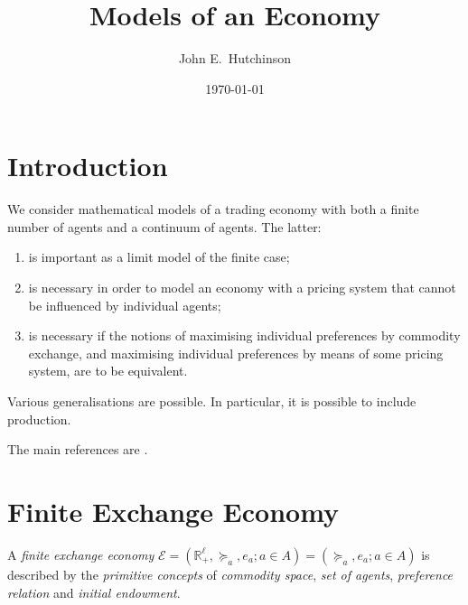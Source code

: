 \documentclass[a4paper]{amsart}
\theoremstyle{plain}
\theoremstyle{definition}
\theoremstyle{remark}
\begin{document}
\title{Models of an Economy}  
\author{John E.\ Hutchinson}
\date{\today}

\maketitle




\tableofcontents







\section{\textbf{Introduction}}

We consider mathematical models of a trading economy with both a finite number of agents and a continuum of agents.  The latter:
\begin{enumerate}
\item is important as a limit model of the finite case;

\item is necessary in order to model an economy with a pricing system that cannot be influenced by individual agents;

\item is necessary if the notions of maximising individual preferences by commodity exchange, and maximising individual preferences by means of some pricing system, are to be equivalent.
\end{enumerate} 

Various generalisations are possible.  In particular, it is possible to include production.

\medskip The main references are \cites{HK, Hil1}.



\section{\textbf{Finite Exchange Economy}}


A \emph{finite}  \emph{exchange economy} $ \mathcal{E} = (\mathbb{R} ^\ell_+, \succeq_a, e_a; a \in A ) =  (\succeq_a, e_a; a \in A )$ is described by the \emph{primitive concepts} of   \emph{commodity space}, \emph{set of agents}, \emph{preference relation} and \emph{initial endowment}.
\end{document}
